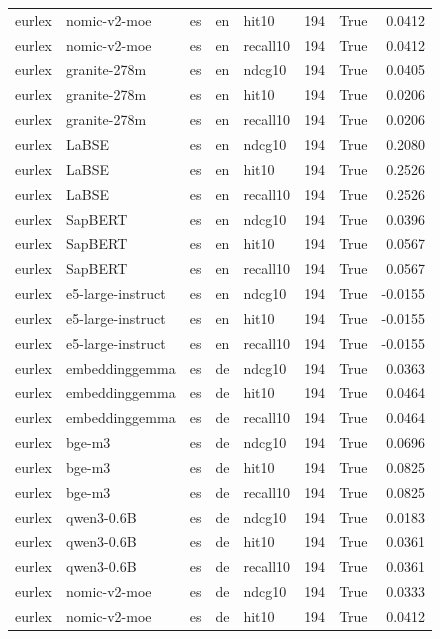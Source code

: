 \begin{tabular}{lllllrrr}
eurlex & nomic-v2-moe & es & en & hit10 & 194 & True & 0.0412 \\
eurlex & nomic-v2-moe & es & en & recall10 & 194 & True & 0.0412 \\
eurlex & granite-278m & es & en & ndcg10 & 194 & True & 0.0405 \\
eurlex & granite-278m & es & en & hit10 & 194 & True & 0.0206 \\
eurlex & granite-278m & es & en & recall10 & 194 & True & 0.0206 \\
eurlex & LaBSE & es & en & ndcg10 & 194 & True & 0.2080 \\
eurlex & LaBSE & es & en & hit10 & 194 & True & 0.2526 \\
eurlex & LaBSE & es & en & recall10 & 194 & True & 0.2526 \\
eurlex & SapBERT & es & en & ndcg10 & 194 & True & 0.0396 \\
eurlex & SapBERT & es & en & hit10 & 194 & True & 0.0567 \\
eurlex & SapBERT & es & en & recall10 & 194 & True & 0.0567 \\
eurlex & e5-large-instruct & es & en & ndcg10 & 194 & True & -0.0155 \\
eurlex & e5-large-instruct & es & en & hit10 & 194 & True & -0.0155 \\
eurlex & e5-large-instruct & es & en & recall10 & 194 & True & -0.0155 \\
eurlex & embeddinggemma & es & de & ndcg10 & 194 & True & 0.0363 \\
eurlex & embeddinggemma & es & de & hit10 & 194 & True & 0.0464 \\
eurlex & embeddinggemma & es & de & recall10 & 194 & True & 0.0464 \\
eurlex & bge-m3 & es & de & ndcg10 & 194 & True & 0.0696 \\
eurlex & bge-m3 & es & de & hit10 & 194 & True & 0.0825 \\
eurlex & bge-m3 & es & de & recall10 & 194 & True & 0.0825 \\
eurlex & qwen3-0.6B & es & de & ndcg10 & 194 & True & 0.0183 \\
eurlex & qwen3-0.6B & es & de & hit10 & 194 & True & 0.0361 \\
eurlex & qwen3-0.6B & es & de & recall10 & 194 & True & 0.0361 \\
eurlex & nomic-v2-moe & es & de & ndcg10 & 194 & True & 0.0333 \\
eurlex & nomic-v2-moe & es & de & hit10 & 194 & True & 0.0412 \\

\end{tabular}
